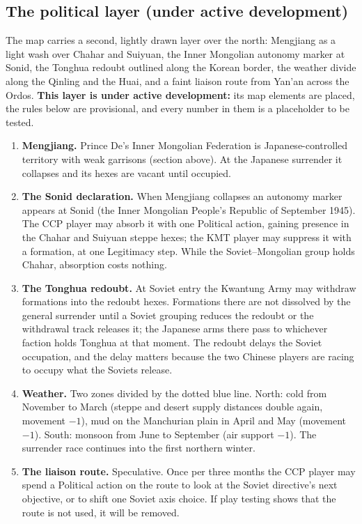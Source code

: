 \documentclass[11pt]{article}
\begin{document}
\subsection{The political layer (under active development)}
The map carries a second, lightly drawn layer over the north: Mengjiang as a light wash over Chahar and Suiyuan, the Inner Mongolian autonomy marker at Sonid, the Tonghua redoubt outlined along the Korean border, the weather divide along the Qinling and the Huai, and a faint liaison route from Yan'an across the Ordos. \textbf{This layer is under active development:} its map elements are placed, the rules below are provisional, and every number in them is a placeholder to be tested.
\begin{enumerate}
\item \textbf{Mengjiang.} Prince De's Inner Mongolian Federation is Japanese-controlled territory with weak garrisons (section above). At the Japanese surrender it collapses and its hexes are vacant until occupied.
\item \textbf{The Sonid declaration.} When Mengjiang collapses an autonomy marker appears at Sonid (the Inner Mongolian People's Republic of September 1945). The CCP player may absorb it with one Political action, gaining presence in the Chahar and Suiyuan steppe hexes; the KMT player may suppress it with a formation, at one Legitimacy step. While the Soviet--Mongolian group holds Chahar, absorption costs nothing.
\item \textbf{The Tonghua redoubt.} At Soviet entry the Kwantung Army may withdraw formations into the redoubt hexes. Formations there are not dissolved by the general surrender until a Soviet grouping reduces the redoubt or the withdrawal track releases it; the Japanese arms there pass to whichever faction holds Tonghua at that moment. The redoubt delays the Soviet occupation, and the delay matters because the two Chinese players are racing to occupy what the Soviets release.
\item \textbf{Weather.} Two zones divided by the dotted blue line. North: cold from November to March (steppe and desert supply distances double again, movement $-1$), mud on the Manchurian plain in April and May (movement $-1$). South: monsoon from June to September (air support $-1$). The surrender race continues into the first northern winter.
\item \textbf{The liaison route.} Speculative. Once per three months the CCP player may spend a Political action on the route to look at the Soviet directive's next objective, or to shift one Soviet axis choice. If play testing shows that the route is not used, it will be removed.
\end{enumerate}
\end{document}

